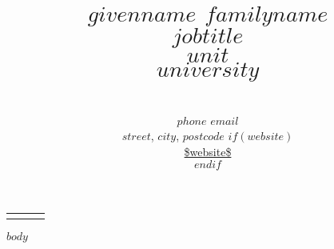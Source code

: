 \documentclass[11pt, legal]{article}
\title{{\huge\bfseries $givenname$ $familyname$}\\[0.1in]{\normalsize {\bfseries $jobtitle$}\\$unit$\\[-0.1in]$university$}} %
\date{} %
\author{\\[-0.40in]{\normalsize $phone$ \hspace{0.35in} $email$}\\ %
{\normalsize $street$, $city$, $postcode$} %
$if(website)$\\{\normalsize \url{$website$}}\\$endif$ } %
\begin{document}
\newlength{\backupparskip}
\setlength{\backupparskip}{\parskip}
\setlength{\parskip}{0pt}
\maketitle
\begin{raggedright}
	\vspace{-0.25in}
	\thispagestyle{empty}
	\begin{tabu} to   \end{tabu}
	\setlength{\parskip}{\backupparskip}
	\vspace{-0.5in}
	$body$
\end{raggedright}
\end{document}
